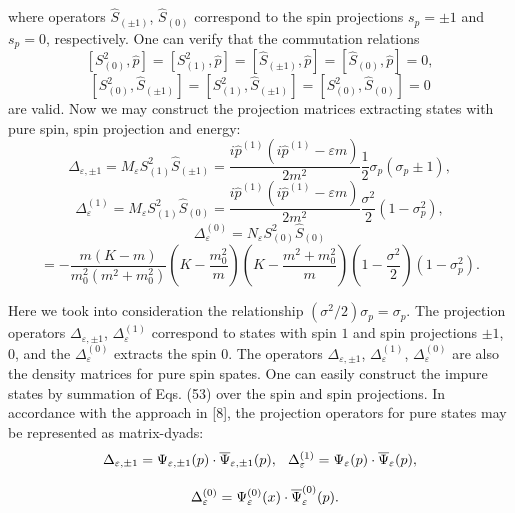 \documentclass[a4paper,12pt]{article}
\begin{document}
where operators $\widehat{S}_{(\pm 1)}$, $\widehat{S}_{(0)}$
correspond to the spin projections $s_p=\pm 1$ and  $s_p=0$,
respectively. One can verify that the commutation relations
\[
\left[ S_{(0)}^2,\widehat{p}\right] =\left[
S_{(1)}^2,\widehat{p}\right] =\left[ \widehat{S}_{(\pm
1)},\widehat{p}\right] =\left[ \widehat{S}_{(0)},
\widehat{p}\right] =0,
\]
\vspace{-8mm}
\begin{equation}
\label{52}
\end{equation}
\vspace{-8mm}
\[
\left[ S_{(0)}^2,\widehat{S}_{(\pm 1)}\right] =\left[
S_{(1)}^2,\widehat{S} _{(\pm 1)}\right] =\left[
S_{(0)}^2,\widehat{S}_{(0)}\right] =0
\]
are valid. Now we may construct the projection matrices extracting
states with pure spin, spin projection and energy:
\[
\Delta _{\varepsilon ,\pm 1}=M_\varepsilon
S_{(1)}^2\widehat{S}_{(\pm 1)}= \frac{i\widehat{p}^{(1)}\left(
i\widehat{p}^{(1)}-\varepsilon m\right) }{2m^2}\frac 12\sigma
_p\left( \sigma _p\pm 1\right),
\]
\[
\Delta _\varepsilon ^{(1)}=M_\varepsilon
S_{(1)}^2\widehat{S}_{(0)}=\frac{i \widehat{p}^{(1)}\left(
i\widehat{p}^{(1)}-\varepsilon m\right) }{2m^2}\frac{\sigma ^2}
2\left( 1-\sigma _p^2\right),
\]
\vspace{-8mm}
\begin{equation}
\label{53}
\end{equation}
\vspace{-8mm}
\[
\Delta _\varepsilon ^{(0)}=N_\varepsilon
S_{(0)}^2\widehat{S}_{(0)}
\]
\[
=-\frac{m\left(K-m\right)}{m_0^2\left(m^2+m_0^2\right)}
\left(K-\frac{m_0^2}{m}\right) \left(K-\frac{m^2+m_0^2}{m}\right)
\left( 1-\frac{ \sigma ^2}2\right) \left( 1-\sigma _p^2\right).
\]

Here we took into consideration the relationship $\left( \sigma
^2/2\right) \sigma _p=\sigma _p$. The projection operators $\Delta
_{\varepsilon ,\pm 1}$, $\Delta _\varepsilon ^{(1)}$ correspond to
states with spin $1$ and spin projections $\pm 1 $, $0$, and the
$\Delta _\varepsilon ^{(0)}$ extracts the spin $0$. The operators
$\Delta _{\varepsilon ,\pm 1}$, $\Delta _\varepsilon ^{(1)}$,
$\Delta _\varepsilon ^{(0)}$ are also the density matrices for
pure spin spates. One can easily construct the impure states by
summation of Eqs. (53) over the spin and spin projections. In
accordance with the approach in [8], the projection operators for
pure states may be represented as matrix-dyads:
\[
\Delta _{\varepsilon ,\pm 1}=\Psi _{\varepsilon ,\pm 1}(p)\cdot
\overline{\Psi}_{\varepsilon ,\pm 1}(p),\hspace{0.1in}\Delta
_\varepsilon ^{(1)}=\Psi_\varepsilon (p)\cdot \overline{\Psi
}_\varepsilon (p),
\]
\vspace{-8mm}
\begin{equation}
\label{54}
\end{equation}
\vspace{-8mm}
\[
\hspace{0.1in}\Delta _\varepsilon ^{(0)}=\Psi
_{\varepsilon}^{(0)}(x)\cdot \overline{\Psi} _{\varepsilon
}^{(0)}(p).
\]
\end{document}
